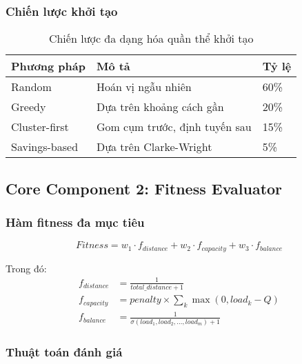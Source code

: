 \documentclass[12pt,a4paper]{article}
\begin{document}
\subsubsection{Chiến lược khởi tạo}

\begin{table}[h]
\centering
\begin{tabular}{@{}lll@{}}
\toprule
\textbf{Phương pháp} & \textbf{Mô tả} & \textbf{Tỷ lệ} \\ \midrule
Random & Hoán vị ngẫu nhiên & 60\% \\
Greedy & Dựa trên khoảng cách gần & 20\% \\
Cluster-first & Gom cụm trước, định tuyến sau & 15\% \\
Savings-based & Dựa trên Clarke-Wright & 5\% \\ \bottomrule
\end{tabular}
\caption{Chiến lược đa dạng hóa quần thể khởi tạo}
\end{table}

\subsection{Core Component 2: Fitness Evaluator}

\subsubsection{Hàm fitness đa mục tiêu}

\begin{equation}
Fitness = w_1 \cdot f_{distance} + w_2 \cdot f_{capacity} + w_3 \cdot f_{balance}
\end{equation}

Trong đó:
\begin{align}
f_{distance} &= \frac{1}{total\_distance + 1} \\
f_{capacity} &= penalty \times \sum_{k} \max(0, load_k - Q) \\
f_{balance} &= \frac{1}{\sigma(load_1, load_2, ..., load_m) + 1}
\end{align}

\subsubsection{Thuật toán đánh giá}
\end{document}
